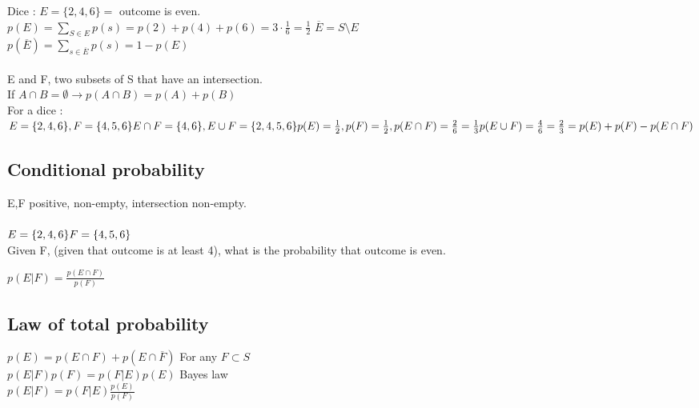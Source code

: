 \documentclass[12pt,a4paper]{article}
\begin{document}
 Dice :
$E = \{2,4,6\} = $ outcome is even.\\
$p(E) = \sum\limits_{S\in E}p(s) = p(2) + p(4) + p(6) = 3\cdot \frac{1}{6} = \frac{1}{2}$
$\overline{E} = S\setminus E$\\
$p(\overline{E}) = \sum\limits_{s\in \overline{E}}p(s) = 1-p(E)$\\
\\
E and F, two subsets of S that have an intersection.\\
If $A\cap B = \emptyset \to p(A\cap B) = p(A) +p(B)$\\
For a dice : $E = \{2,4,6\}, F = \{4,5,6\}\\
E\cap F = \{4,6\}, E \cup F = \{2,4,5,6\}\\
p(E) = \frac{1}{2}, p(F) = \frac{1}{2}, p(E\cap F) = \frac{2}{6} = \frac{1}{3}\\
p(E\cup F) = \frac{4}{6} = \frac{2}{3} = p(E) + p(F) -p(E\cap F)$
\subsection{Conditional probability}
E,F positive, non-empty, intersection non-empty.\\
\\
$E = \{2,4,6\}\\
F = \{4,5,6\}$\\
Given F, (given that outcome is at least 4), what is the probability that outcome is even.
\begin{boite}[0.25]
	$p(E|F) = \frac{p(E\cap F)}{p(F)}$
\end{boite}

\begin{boite}
\subsection{Law of total probability}
$p(E) = p(E\cap F) + p(E\cap \overline{F})$ For any $F\subset S$	\\
$p(E|F)p(F) =p(F|E)p(E)$ Bayes law\\ 
$p(E|F) = p(F|E)\frac{p(E)}{p(F)}$
\end{boite}
\end{document}
